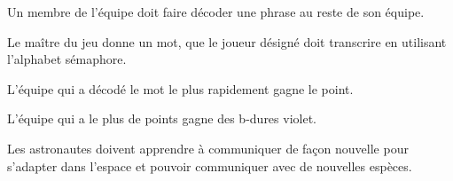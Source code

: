 \documentclass{grand-jeu}
\begin{document}
\begin{liste-materiel}
\end{liste-materiel}

\begin{regles}
Un membre de l’équipe doit faire décoder une phrase au reste de son équipe. 

Le maître du jeu donne un mot, que le joueur désigné doit transcrire en utilisant l’alphabet sémaphore. 

L’équipe qui a décodé le mot le plus rapidement gagne le point. 

L'équipe qui a le plus de points gagne des b-dures violet. 
\end{regles}

\begin{imaginaire}
Les astronautes doivent apprendre à communiquer de façon nouvelle pour s'adapter dans l'espace et pouvoir communiquer avec de nouvelles espèces.
\end{imaginaire}

\begin{moments-stop}
\end{moments-stop}
\end{document}
